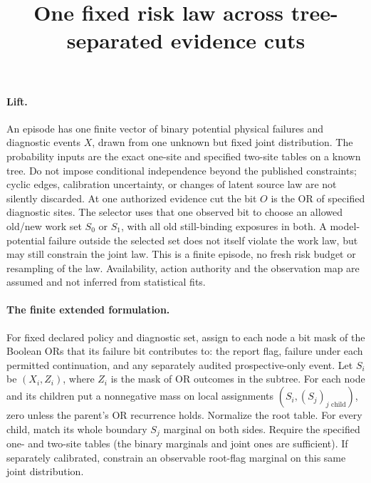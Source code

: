 \documentclass[11pt]{article}
\title{One fixed risk law across tree-separated evidence cuts}
\begin{document}
\maketitle
\paragraph{Lift.}
An episode has one finite vector of binary potential physical
failures and diagnostic events \(X\), drawn from one unknown but
fixed joint distribution. The probability inputs are the exact
one-site and specified two-site tables on a known tree. Do not
impose conditional independence beyond the published constraints;
cyclic edges, calibration uncertainty, or changes of latent source
law are not silently discarded. At one authorized evidence cut
the bit \(O\) is the OR of specified diagnostic sites. The selector
uses that one observed bit to choose an allowed old/new work set
\(S_0\) or \(S_1\), with all old still-binding exposures in both.
A model-potential failure outside the selected set does not itself
violate the work law, but may still constrain the joint law.
This is a finite episode, no fresh risk budget or resampling of
the law. Availability, action authority and the observation map
are assumed and not inferred from statistical fits.

\paragraph{The finite extended formulation.}
For fixed declared policy and diagnostic set, assign to each node
a bit mask of the Boolean ORs that its failure bit contributes to:
the report flag, failure under each permitted continuation, and
any separately audited prospective-only event. Let \(S_i\) be
\((X_i,Z_i)\), where \(Z_i\) is the mask of OR outcomes in the
subtree. For each node and its children put a nonnegative mass
on local assignments \((S_i,(S_j)_{j\text{ child}})\), zero unless
the parent's OR recurrence holds. Normalize the root table.
For every child, match its whole boundary \(S_j\) marginal on
both sides. Require the specified one- and two-site tables
(the binary marginals and joint ones are sufficient). If separately
calibrated, constrain an observable root-flag marginal on this
same joint distribution.
\end{document}
